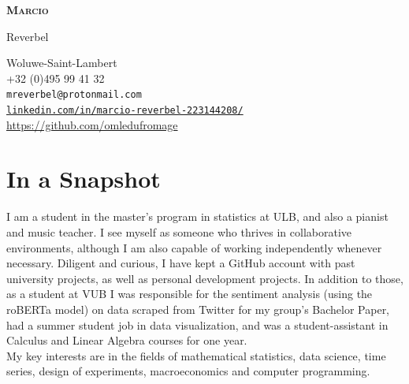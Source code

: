 \documentclass[12pt]{article}
\newcommand{\mycolor}{Fuchsia}
\newcommand{\thesectionicon}{}
\newcommand{\sectionicon}[1]{\renewcommand{\thesectionicon}{#1}}
\begin{document}
\begin{minipage}[t]{0.25\textwidth}
  {\sffamily\bfseries\scshape\huge
    Marcio
    
         \vspace{1ex}
     
    Reverbel}
\end{minipage}
\hfill
\begin{minipage}[t]{0.65\textwidth}
  \begin{small}
  \begin{flushright}
  Woluwe-Saint-Lambert\ \ \textcolor{\mycolor}{\faHome\\}
  +32 (0)495 99 41 32\ \ \textcolor{\mycolor}{\faPhone\\}
  \texttt{mreverbel@protonmail.com}\ \ \textcolor{\mycolor}{\faEnvelope\\}
  \href{https://linkedin.com/in/marcio-reverbel-223144208/}{\texttt{linkedin.com/in/marcio-reverbel-223144208/}}\ \ \textcolor{\mycolor}{\faLinkedin\\}
  \url{https://github.com/omledufromage}\ \ \textcolor{\mycolor}{\faGithub\\}
  \end{flushright}
  \end{small}
\end{minipage}

\sectionicon{\faUser}
\section{In a Snapshot}

I am a student in the master's program in statistics at ULB, and also a pianist and music teacher. I see myself as someone who thrives in collaborative environments, although I am also capable of working independently whenever necessary. Diligent and curious, I have kept a GitHub account with past university projects, as well as personal development projects. In addition to those, as a student at VUB I was responsible for the sentiment analysis (using the roBERTa model) on data scraped from Twitter for my group's Bachelor Paper, had a summer student job in data visualization, and was a student-assistant in Calculus and Linear Algebra courses for one year.\\

My key interests are in the fields of mathematical statistics, data science, time series, design of experiments, macroeconomics and computer programming.
\end{document}
